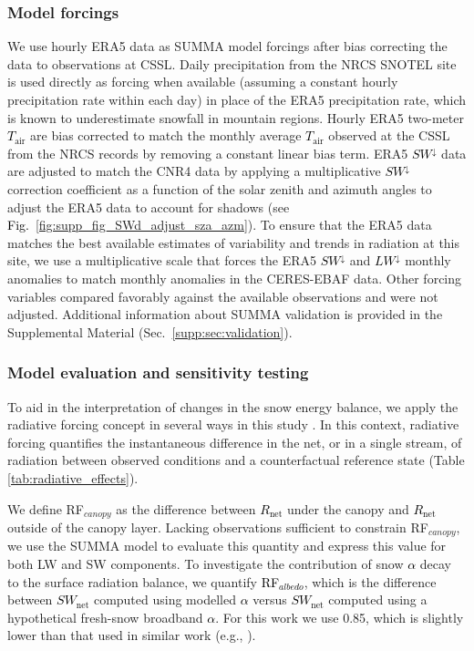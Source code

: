 \documentclass[draft]{agujournal2019}
\newcommand{\fignop}[2]{\textcolor{black}{Fig.~\ref{#1}{#2}}}  %
\newcommand{\tair}{\textcolor{black}{$T_{\mathrm{air}}$}\xspace}
\newcommand{\lwdn}{\textcolor{black}{$LW^{\downarrow}$}\xspace}
\newcommand{\rnet}{\textcolor{black}{$R_{\mathrm{net}}$}\xspace}
\newcommand{\swnet}{\textcolor{black}{$SW_{\mathrm{net}}$}\xspace}
\newcommand{\swdn}{\textcolor{black}{$SW^{\downarrow}$}\xspace}
\newcommand{\albedo}{\textcolor{black}{$\alpha$}\xspace}
\newcommand{\rfalb}{\textcolor{black}{RF$_{albedo}$}\xspace}
\begin{document}
\subsubsection{Model forcings}
We use hourly ERA5 data \cite{Hersbach2020-era5} as SUMMA model forcings after bias correcting the data to observations at CSSL.
Daily precipitation from the NRCS SNOTEL site is used directly as forcing when available (assuming a constant hourly precipitation rate within each day) in place of the ERA5 precipitation rate, which is known to underestimate snowfall in mountain regions.
Hourly ERA5 two-meter \tair are bias corrected to match the monthly average \tair observed at the CSSL from the NRCS records by removing a constant linear bias term.
ERA5 \swdn data are adjusted to match the CNR4 data by applying a multiplicative \swdn correction coefficient as a function of the solar zenith and azimuth angles to adjust the ERA5 data to account for shadows (see \fignop{fig:supp_fig_SWd_adjust_sza_azm}{}).
To ensure that the ERA5 data matches the best available estimates of variability and trends in radiation at this site, we use a multiplicative scale that forces the ERA5 \swdn and \lwdn monthly anomalies to match monthly anomalies in the CERES-EBAF data.
Other forcing variables compared favorably against the available observations and were not adjusted.
Additional information about SUMMA validation is provided in the Supplemental Material (Sec.~\ref{supp:sec:validation}).



\subsubsection{Model evaluation and sensitivity testing}\label{sec:methods:radforce}
To aid in the interpretation of changes in the snow energy balance, we apply the radiative forcing concept in several ways in this study \cite{Ramanathan1989-pa, Deems2013-vv, Rudisill2025-cx}.
In this context, radiative forcing quantifies the instantaneous difference in the net, or in a single stream, of radiation between observed conditions and a counterfactual reference state (Table \ref{tab:radiative_effects}).

We define RF$_{canopy}$ as the difference between \rnet under the canopy and \rnet outside of the canopy layer.
Lacking observations sufficient to constrain RF$_{canopy}$, we use the SUMMA model to evaluate this quantity and express this value for both LW and SW components.
To investigate the contribution of snow \albedo decay to the surface radiation balance, we quantify \rfalb, which is the difference between \swnet computed using modelled \albedo versus \swnet computed using a hypothetical fresh-snow broadband \albedo.
For this work we use 0.85, which is slightly lower than that used in similar work (e.g., ).
\end{document}
